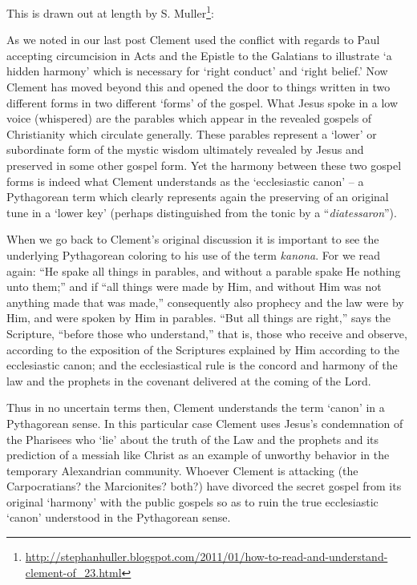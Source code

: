 This is drawn out at length by S. Muller\footnote{\url{http://stephanhuller.blogspot.com/2011/01/how-to-read-and-understand-clement-of_23.html}}:

\begin{quotationx}
As we noted in our last post Clement used the conflict with regards to Paul accepting circumcision in Acts and the Epistle to the Galatians to illustrate `a hidden harmony' which is necessary for `right conduct' and `right belief.' Now Clement has moved beyond this and opened the door to things written in two different forms in two different `forms' of the gospel. What Jesus spoke in a low voice (whispered) are the parables which appear in the revealed gospels of Christianity which circulate generally. These parables represent a `lower' or subordinate form of the mystic wisdom ultimately revealed by Jesus and preserved in some other gospel form. Yet the harmony between these two gospel forms is indeed what Clement understands as the `ecclesiastic canon' -- a Pythagorean term which clearly represents again the preserving of an original tune in a `lower key' (perhaps distinguished from the tonic by a ``\emph{diatessaron}''). 

When we go back to Clement's original discussion it is important to see the underlying Pythagorean coloring to his use of the term \emph{kanona}. For we read again: ``He spake all things in parables, and without a parable spake He nothing unto them;'' and if ``all things were made by Him, and without Him was not anything made that was made,'' consequently also prophecy and the law were by Him, and were spoken by Him in parables. ``But all things are right,'' says the Scripture, ``before those who understand,'' that is, those who receive and observe, according to the exposition of the Scriptures explained by Him according to the ecclesiastic canon; and the ecclesiastical rule is the concord and harmony of the law and the prophets in the covenant delivered at the coming of the Lord.

Thus in no uncertain terms then, Clement understands the term `canon' in a Pythagorean sense. In this particular case Clement uses Jesus's condemnation of the Pharisees who `lie' about the truth of the Law and the prophets and its prediction of a messiah like Christ as an example of unworthy behavior in the temporary Alexandrian community. Whoever Clement is attacking (the Carpocratians? the Marcionites? both?) have divorced the secret gospel from its original `harmony' with the public gospels so as to ruin the true ecclesiastic `canon' understood in the Pythagorean sense.
\end{quotationx}


